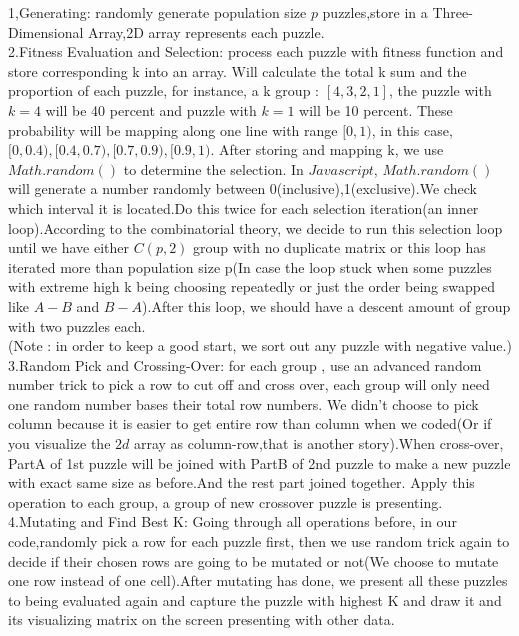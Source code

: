 \documentclass[12pt, letterpaper]{article}
\begin{document}
1,Generating: randomly generate population size $p$ puzzles,store in a Three-Dimensional Array,2D array represents each puzzle.\\

2.Fitness Evaluation and Selection: process each puzzle with fitness function and store corresponding k into an array. Will calculate the total k sum and the proportion of each puzzle, for instance, a k group : $[4,3,2,1]$, the puzzle with ${k=4}$ will be 40 percent and puzzle with $k=1$ will be 10 percent. These probability will be mapping along one line with range $[0,1)$, in this case,$[0,0.4),[0.4,0.7),[0.7,0.9),[0.9,1)$. After storing and mapping k, we use $Math.random()$ to determine the selection. In $Javascript$, $Math.random()$ will generate a number randomly between 0(inclusive),1(exclusive).We check which interval it is located.Do this twice for each selection iteration(an inner loop).According to the combinatorial theory, we decide to run this selection loop until we have either $C(p,2)$ group with no duplicate matrix or this loop has iterated more than population size p(In case the loop stuck when some puzzles with extreme high k being choosing repeatedly or just the order being swapped like $A-B$ and $B-A$).After this loop, we should have a descent amount of group with two puzzles each.\\

(Note : in order to keep a good start, we sort out any puzzle with negative value.)\\

3.Random Pick and Crossing-Over: for each group , use an advanced random number trick to pick a row to cut off and cross over, each group will only need one random number bases their total row numbers. We didn't choose to pick column because it is easier to get entire row than column when we coded(Or if you visualize the $2d$ array as column-row,that is another story).When cross-over, PartA of 1st puzzle will be joined with PartB of 2nd puzzle to make a new puzzle with exact same size as before.And the rest part joined together. Apply this operation to each group, a group of new crossover puzzle is presenting.\\

4.Mutating and Find Best K: Going through all operations before, in our code,randomly pick a row for each puzzle first, then we use random trick again to decide if their chosen rows are going to be mutated or not(We choose to mutate one row instead of one cell).After mutating has done, we present all these puzzles to being evaluated again and capture the puzzle with highest K and draw it and its visualizing matrix on the screen presenting with other data.\\
\end{document}
